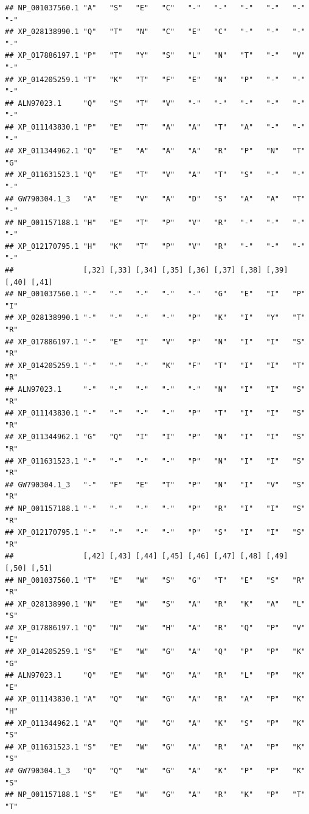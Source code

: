 \documentclass[]{article}
\begin{document}
\begin{verbatim}
## NP_001037560.1 "A"   "S"   "E"   "C"   "-"   "-"   "-"   "-"   "-"   "-"  
## XP_028138990.1 "Q"   "T"   "N"   "C"   "E"   "C"   "-"   "-"   "-"   "-"  
## XP_017886197.1 "P"   "T"   "Y"   "S"   "L"   "N"   "T"   "-"   "V"   "-"  
## XP_014205259.1 "T"   "K"   "T"   "F"   "E"   "N"   "P"   "-"   "-"   "-"  
## ALN97023.1     "Q"   "S"   "T"   "V"   "-"   "-"   "-"   "-"   "-"   "-"  
## XP_011143830.1 "P"   "E"   "T"   "A"   "A"   "T"   "A"   "-"   "-"   "-"  
## XP_011344962.1 "Q"   "E"   "A"   "A"   "A"   "R"   "P"   "N"   "T"   "G"  
## XP_011631523.1 "Q"   "E"   "T"   "V"   "A"   "T"   "S"   "-"   "-"   "-"  
## GW790304.1_3   "A"   "E"   "V"   "A"   "D"   "S"   "A"   "A"   "T"   "-"  
## NP_001157188.1 "H"   "E"   "T"   "P"   "V"   "R"   "-"   "-"   "-"   "-"  
## XP_012170795.1 "H"   "K"   "T"   "P"   "V"   "R"   "-"   "-"   "-"   "-"  
##                [,32] [,33] [,34] [,35] [,36] [,37] [,38] [,39] [,40] [,41]
## NP_001037560.1 "-"   "-"   "-"   "-"   "-"   "G"   "E"   "I"   "P"   "I"  
## XP_028138990.1 "-"   "-"   "-"   "-"   "P"   "K"   "I"   "Y"   "T"   "R"  
## XP_017886197.1 "-"   "E"   "I"   "V"   "P"   "N"   "I"   "I"   "S"   "R"  
## XP_014205259.1 "-"   "-"   "-"   "K"   "F"   "T"   "I"   "I"   "T"   "R"  
## ALN97023.1     "-"   "-"   "-"   "-"   "-"   "N"   "I"   "I"   "S"   "R"  
## XP_011143830.1 "-"   "-"   "-"   "-"   "P"   "T"   "I"   "I"   "S"   "R"  
## XP_011344962.1 "G"   "Q"   "I"   "I"   "P"   "N"   "I"   "I"   "S"   "R"  
## XP_011631523.1 "-"   "-"   "-"   "-"   "P"   "N"   "I"   "I"   "S"   "R"  
## GW790304.1_3   "-"   "F"   "E"   "T"   "P"   "N"   "I"   "V"   "S"   "R"  
## NP_001157188.1 "-"   "-"   "-"   "-"   "P"   "R"   "I"   "I"   "S"   "R"  
## XP_012170795.1 "-"   "-"   "-"   "-"   "P"   "S"   "I"   "I"   "S"   "R"  
##                [,42] [,43] [,44] [,45] [,46] [,47] [,48] [,49] [,50] [,51]
## NP_001037560.1 "T"   "E"   "W"   "S"   "G"   "T"   "E"   "S"   "R"   "R"  
## XP_028138990.1 "N"   "E"   "W"   "S"   "A"   "R"   "K"   "A"   "L"   "S"  
## XP_017886197.1 "Q"   "N"   "W"   "H"   "A"   "R"   "Q"   "P"   "V"   "E"  
## XP_014205259.1 "S"   "E"   "W"   "G"   "A"   "Q"   "P"   "P"   "K"   "G"  
## ALN97023.1     "Q"   "E"   "W"   "G"   "A"   "R"   "L"   "P"   "K"   "E"  
## XP_011143830.1 "A"   "Q"   "W"   "G"   "A"   "R"   "A"   "P"   "K"   "H"  
## XP_011344962.1 "A"   "Q"   "W"   "G"   "A"   "K"   "S"   "P"   "K"   "S"  
## XP_011631523.1 "S"   "E"   "W"   "G"   "A"   "R"   "A"   "P"   "K"   "S"  
## GW790304.1_3   "Q"   "Q"   "W"   "G"   "A"   "K"   "P"   "P"   "K"   "S"  
## NP_001157188.1 "S"   "E"   "W"   "G"   "A"   "R"   "K"   "P"   "T"   "T"  

\end{verbatim}
\end{document}
